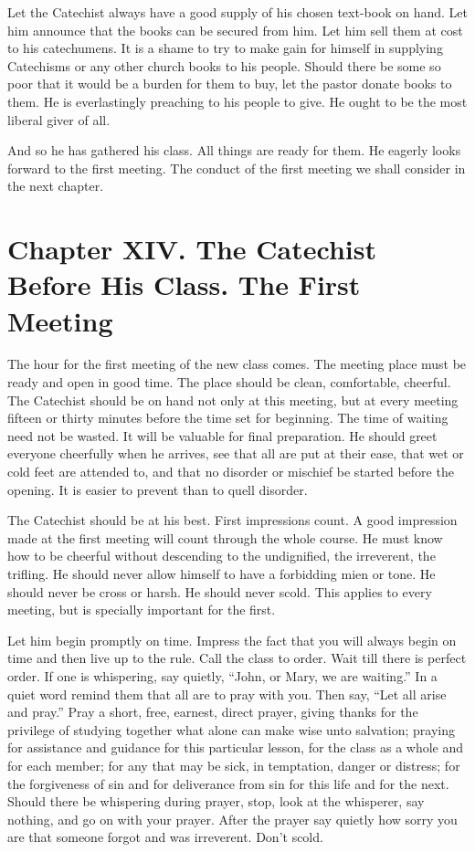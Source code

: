 Let the Catechist always have a good supply of his chosen text-book on hand. Let him announce that the books can be secured from him. Let him sell them at cost to his catechumens. It is a shame to try to make gain for himself in supplying Catechisms or any other church books to his people. Should there be some so poor that it would be a burden for them to buy, let the pastor donate books to them. He is everlastingly preaching to his people to give. He ought to be the most liberal giver of all.

And so he has gathered his class. All things are ready for them. He eagerly looks forward to the first meeting. The conduct of the first meeting we shall consider in the next chapter.

\chapter[Chapter XIV. The First Meeting]{Chapter XIV. The Catechist Before His Class. The First Meeting}


The hour for the first meeting of the new class comes. The meeting place must be ready and open in good time. The place should be clean, comfortable, cheerful. The Catechist should be on hand not only at this meeting, but at every meeting fifteen or thirty minutes before the time set for beginning. The time of waiting need not be wasted. It will be valuable for final preparation. He should greet everyone cheerfully when he arrives, see that all are put at their ease, that wet or cold feet are attended to, and that no disorder or mischief be started before the opening. It is easier to prevent than to quell disorder.

The Catechist should be at his best. First impressions count. A good impression made at the first meeting will count through the whole course. He must know how to be cheerful without descending to the undignified, the irreverent, the trifling. He should never allow himself to have a forbidding mien or tone. He should never be cross or harsh. He should never scold. This applies to every meeting, but is specially important for the first.

Let him begin promptly on time. Impress the fact that you will always begin on time and then live up to the rule. Call the class to order. Wait till there is perfect order. If one is whispering, say quietly, “John, or Mary, we are waiting.” In a quiet word remind them that all are to pray with you. Then say, “Let all arise and pray.” Pray a short, free, earnest, direct prayer, giving thanks for the privilege of studying together what alone can make wise unto salvation; praying for assistance and guidance for this particular lesson, for the class as a whole and for each member; for any that may be sick, in temptation, danger or distress; for the forgiveness of sin and for deliverance from sin for this life and for the next. Should there be whispering during prayer, stop, look at the whisperer, say nothing, and go on with your prayer. After the prayer say quietly how sorry you are that someone forgot and was irreverent. Don’t scold.

